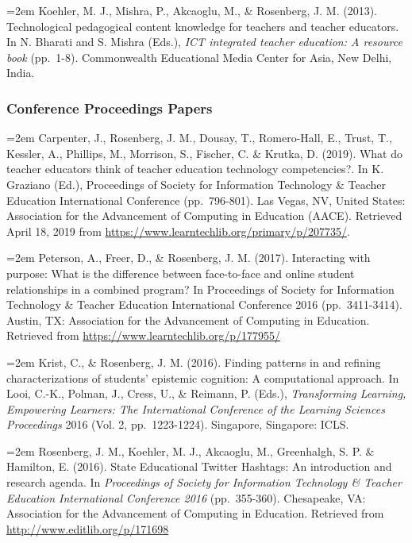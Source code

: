 \documentclass[14,]{article}
\begin{document}
\hangindent=2em Koehler, M. J., Mishra, P., Akcaoglu, M., \& Rosenberg,
J. M. (2013). Technological pedagogical content knowledge for teachers
and teacher educators. In N. Bharati and S. Mishra (Eds.), \emph{ICT
integrated teacher education: A resource book} (pp.~1-8). Commonwealth
Educational Media Center for Asia, New Delhi, India.

\hypertarget{conference-proceedings-papers}{%
\subsubsection{Conference Proceedings
Papers}\label{conference-proceedings-papers}}

\hangindent=2em Carpenter, J., Rosenberg, J. M., Dousay, T.,
Romero-Hall, E., Trust, T., Kessler, A., Phillips, M., Morrison, S.,
Fischer, C. \& Krutka, D. (2019). What do teacher educators think of
teacher education technology competencies?. In K. Graziano (Ed.),
Proceedings of Society for Information Technology \& Teacher Education
International Conference (pp.~796-801). Las Vegas, NV, United States:
Association for the Advancement of Computing in Education (AACE).
Retrieved April 18, 2019 from
\url{https://www.learntechlib.org/primary/p/207735/}.

\hangindent=2em Peterson, A., Freer, D., \& Rosenberg, J. M. (2017).
Interacting with purpose: What is the difference between face-to-face
and online student relationships in a combined program? In Proceedings
of Society for Information Technology \& Teacher Education International
Conference 2016 (pp.~3411-3414). Austin, TX: Association for the
Advancement of Computing in Education. Retrieved from
\url{https://www.learntechlib.org/p/177955/}

\hangindent=2em Krist, C., \& Rosenberg, J. M. (2016). Finding patterns
in and refining characterizations of students' epistemic cognition: A
computational approach. In Looi, C.-K., Polman, J., Cress, U., \&
Reimann, P. (Eds.), \emph{Transforming Learning, Empowering Learners:
The International Conference of the Learning Sciences Proceedings} 2016
(Vol. 2, pp.~1223-1224). Singapore, Singapore: ICLS.

\hangindent=2em Rosenberg, J. M., Koehler, M. J., Akcaoglu, M.,
Greenhalgh, S. P. \& Hamilton, E. (2016). State Educational Twitter
Hashtags: An introduction and research agenda. In \emph{Proceedings of
Society for Information Technology \& Teacher Education International
Conference 2016} (pp.~355-360). Chesapeake, VA: Association for the
Advancement of Computing in Education. Retrieved from
\url{http://www.editlib.org/p/171698}
\end{document}
